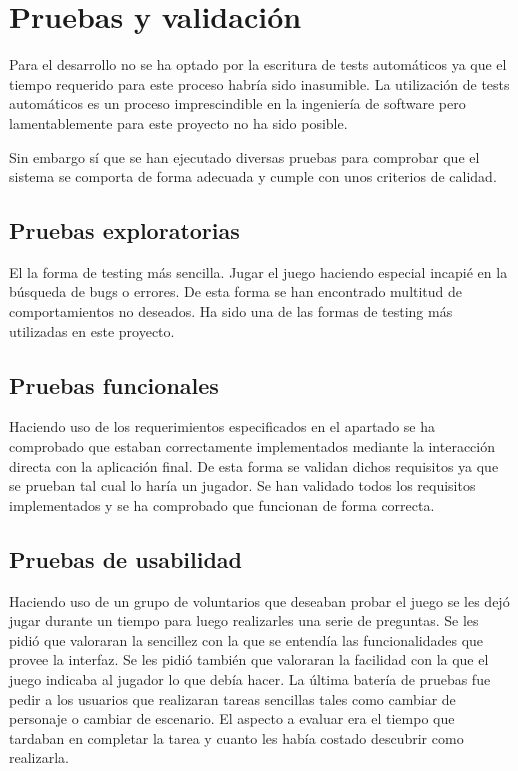 \chapter{Pruebas y validación}

Para el desarrollo no se ha optado por la escritura de tests automáticos ya que el tiempo requerido para este proceso habría sido inasumible. La utilización de tests automáticos es un proceso imprescindible en la ingeniería de software pero lamentablemente para este proyecto no ha sido posible.

Sin embargo sí que se han ejecutado diversas pruebas para comprobar que el sistema se comporta de forma adecuada y cumple con unos criterios de calidad.

\section{Pruebas exploratorias}

El la forma de testing más sencilla. Jugar el juego haciendo especial incapié en la búsqueda de bugs o errores. De esta forma se han encontrado multitud de comportamientos no deseados. Ha sido una de las formas de testing más utilizadas en este proyecto.

\section{Pruebas funcionales}

Haciendo uso de los requerimientos especificados en el apartado  se ha comprobado que estaban correctamente implementados mediante la interacción directa con la aplicación final. De esta forma se validan dichos requisitos ya que se prueban tal cual lo haría un jugador.
Se han validado todos los requisitos implementados y se ha comprobado que funcionan de forma correcta.

\section{Pruebas de usabilidad}

Haciendo uso de un grupo de voluntarios que deseaban probar el juego se les dejó jugar durante un tiempo para luego realizarles una serie de preguntas. 
Se les pidió que valoraran la sencillez con la que se entendía las funcionalidades que provee la interfaz. Se les pidió también que valoraran la facilidad con la que el juego indicaba al jugador lo que debía hacer.
La última batería de pruebas fue pedir a los usuarios que realizaran tareas sencillas tales como cambiar de personaje o cambiar de escenario. El aspecto a evaluar era el tiempo que tardaban en completar la tarea y cuanto les había costado descubrir como realizarla.


